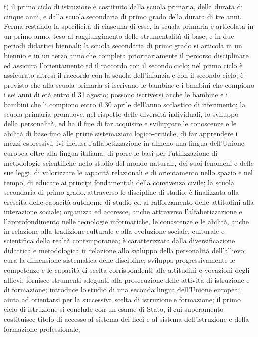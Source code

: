 f) il primo ciclo di istruzione è costituito dalla scuola primaria, della durata di cinque anni, e dalla scuola secondaria di primo grado della durata di tre anni. Ferma restando la specificità di ciascuna di esse, la scuola primaria è articolata in un primo anno, teso al raggiungimento delle strumentalità di base, e in due periodi didattici biennali; la scuola secondaria di primo grado si articola in un biennio e in un terzo anno che completa prioritariamente il percorso disciplinare ed assicura l'orientamento ed il raccordo con il secondo ciclo; nel primo ciclo è assicurato altresì il raccordo con la scuola dell'infanzia e con il secondo ciclo; è previsto che alla scuola primaria si iscrivano le bambine e i bambini che compiono i sei anni di età entro il 31 agosto; possono iscriversi anche le bambine e i bambini che li compiono entro il 30 aprile dell'anno scolastico di riferimento; la scuola primaria promuove, nel rispetto delle diversità individuali, lo sviluppo della personalità, ed ha il fine di far acquisire e sviluppare le conoscenze e le abilità di base fino alle prime sistemazioni logico-critiche, di far apprendere i mezzi espressivi, ivi inclusa l'alfabetizzazione in almeno una lingua dell'Unione europea oltre alla lingua italiana, di porre le basi per l'utilizzazione di metodologie scientifiche nello studio del mondo naturale, dei suoi fenomeni e delle sue leggi, di valorizzare le capacità relazionali e di orientamento nello spazio e nel tempo, di educare ai principi fondamentali della convivenza civile; la scuola secondaria di primo grado, attraverso le discipline di studio, è finalizzata alla crescita delle capacità autonome di studio ed al rafforzamento delle attitudini alla interazione sociale; organizza ed accresce, anche attraverso l'alfabetizzazione e l'approfondimento nelle tecnologie informatiche, le conoscenze e le abilità, anche in relazione alla tradizione culturale e alla evoluzione sociale, culturale e scientifica della realtà contemporanea; è caratterizzata dalla diversificazione didattica e metodologica in relazione allo sviluppo della personalità dell'allievo; cura la dimensione sistematica delle discipline; sviluppa progressivamente le competenze e le capacità di scelta corrispondenti alle attitudini e vocazioni degli allievi; fornisce strumenti adeguati alla prosecuzione delle attività di istruzione e di formazione; introduce lo studio di una seconda lingua dell'Unione europea; aiuta ad orientarsi per la successiva scelta di istruzione e formazione; il primo ciclo di istruzione si conclude con un esame di Stato, il cui superamento costituisce titolo di accesso al sistema dei licei e al sistema dell'istruzione e della formazione professionale;

